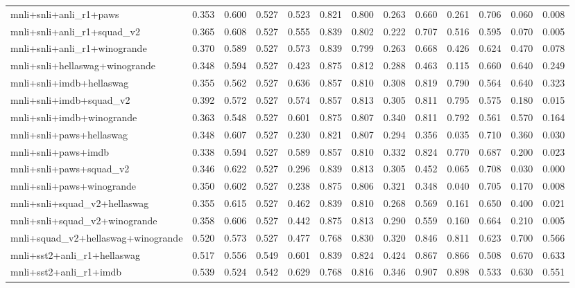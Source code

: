 \begin{table}[t]
\begin{tabular}{lrrrrrrrrrrrr}
    mnli+snli+anli\_r1+paws & 0.353 & 0.600 & 0.527 & 0.523 & 0.821 & 0.800 & 0.263 & 0.660 & 0.261 & 0.706 & 0.060 & 0.008 \\
    mnli+snli+anli\_r1+squad\_v2 & 0.365 & 0.608 & 0.527 & 0.555 & 0.839 & 0.802 & 0.222 & 0.707 & 0.516 & 0.595 & 0.070 & 0.005 \\
    mnli+snli+anli\_r1+winogrande & 0.370 & 0.589 & 0.527 & 0.573 & 0.839 & 0.799 & 0.263 & 0.668 & 0.426 & 0.624 & 0.470 & 0.078 \\
    mnli+snli+hellaswag+winogrande & 0.348 & 0.594 & 0.527 & 0.423 & 0.875 & 0.812 & 0.288 & 0.463 & 0.115 & 0.660 & 0.640 & 0.249 \\
    mnli+snli+imdb+hellaswag & 0.355 & 0.562 & 0.527 & 0.636 & 0.857 & 0.810 & 0.308 & 0.819 & 0.790 & 0.564 & 0.640 & 0.323 \\
    mnli+snli+imdb+squad\_v2 & 0.392 & 0.572 & 0.527 & 0.574 & 0.857 & 0.813 & 0.305 & 0.811 & 0.795 & 0.575 & 0.180 & 0.015 \\
    mnli+snli+imdb+winogrande & 0.363 & 0.548 & 0.527 & 0.601 & 0.875 & 0.807 & 0.340 & 0.811 & 0.792 & 0.561 & 0.570 & 0.164 \\
    mnli+snli+paws+hellaswag & 0.348 & 0.607 & 0.527 & 0.230 & 0.821 & 0.807 & 0.294 & 0.356 & 0.035 & 0.710 & 0.360 & 0.030 \\
    mnli+snli+paws+imdb & 0.338 & 0.594 & 0.527 & 0.589 & 0.857 & 0.810 & 0.332 & 0.824 & 0.770 & 0.687 & 0.200 & 0.023 \\
    mnli+snli+paws+squad\_v2 & 0.346 & 0.622 & 0.527 & 0.296 & 0.839 & 0.813 & 0.305 & 0.452 & 0.065 & 0.708 & 0.030 & 0.000 \\
    mnli+snli+paws+winogrande & 0.350 & 0.602 & 0.527 & 0.238 & 0.875 & 0.806 & 0.321 & 0.348 & 0.040 & 0.705 & 0.170 & 0.008 \\
    mnli+snli+squad\_v2+hellaswag & 0.355 & 0.615 & 0.527 & 0.462 & 0.839 & 0.810 & 0.268 & 0.569 & 0.161 & 0.650 & 0.400 & 0.021 \\
    mnli+snli+squad\_v2+winogrande & 0.358 & 0.606 & 0.527 & 0.442 & 0.875 & 0.813 & 0.290 & 0.559 & 0.160 & 0.664 & 0.210 & 0.005 \\
    mnli+squad\_v2+hellaswag+winogrande & 0.520 & 0.573 & 0.527 & 0.477 & 0.768 & 0.830 & 0.320 & 0.846 & 0.811 & 0.623 & 0.700 & 0.566 \\
    mnli+sst2+anli\_r1+hellaswag & 0.517 & 0.556 & 0.549 & 0.601 & 0.839 & 0.824 & 0.424 & 0.867 & 0.866 & 0.508 & 0.670 & 0.633 \\
    mnli+sst2+anli\_r1+imdb & 0.539 & 0.524 & 0.542 & 0.629 & 0.768 & 0.816 & 0.346 & 0.907 & 0.898 & 0.533 & 0.630 & 0.551 \\

\end{tabular}
\end{table}
